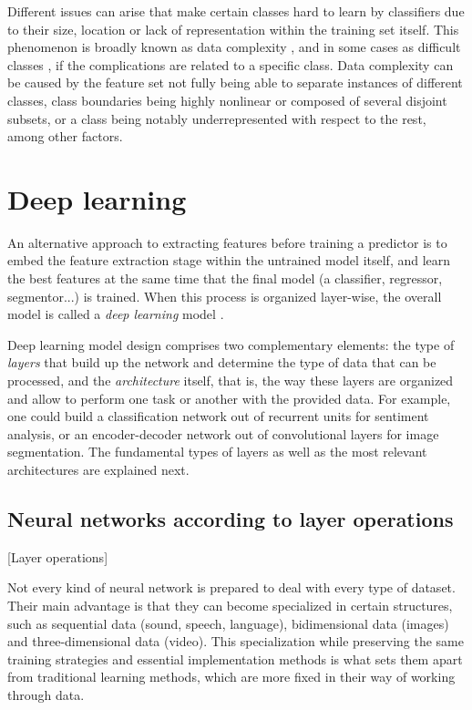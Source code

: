 
Different issues can arise that make certain classes hard to learn by classifiers due to their size, location or lack of representation within the training set itself. This phenomenon is broadly known as data complexity , and in some cases as difficult classes , if the complications are related to a specific class. Data complexity can be caused by the feature set not fully being able to separate instances of different classes, class boundaries being highly nonlinear or composed of several disjoint subsets, or a class being notably underrepresented with respect to the rest, among other factors.


\section{Deep learning}

An alternative approach to extracting features before training a predictor 
is to embed the feature extraction stage within the untrained model itself, and learn the best features at the same time that the final model (a classifier, regressor, segmentor...) is trained. When this process is organized layer-wise, the overall model is called a \textit{deep learning} model .

Deep learning model design comprises two complementary elements: the type of \textit{layers} that build up the network and determine the type of data that can be processed, and the \textit{architecture} itself, that is, the way these layers are organized and allow to perform one task or another with the provided data. For example, one could build a classification network out of recurrent units for sentiment analysis, or an encoder-decoder network out of convolutional layers for image segmentation. The fundamental types of layers as well as the most relevant architectures are explained next.

\subsection{Neural networks according to layer operations}[Layer operations]\label{sec:layers}

Not every kind of neural network is prepared to deal with every type of dataset. Their main advantage is that they can become specialized in certain structures, such as sequential data (sound, speech, language), bidimensional data (images) and three-dimensional data (video). This specialization while preserving the same training strategies and essential implementation methods is what sets them apart from traditional learning methods, which are more fixed in their way of working through data.

